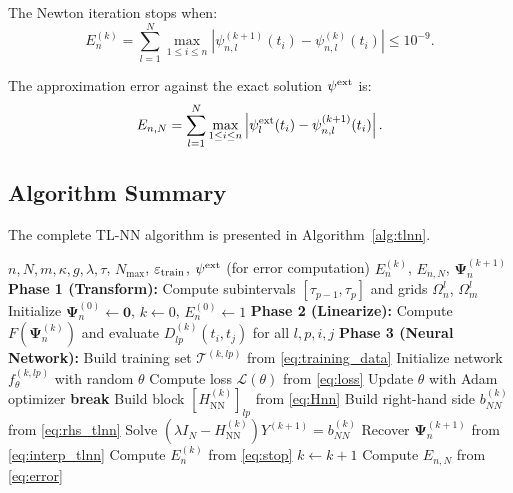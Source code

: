 \documentclass[12pt, a4paper]{article}
\newcommand{\norm}[1]{\left\| #1 \right\|}
\newcommand{\HNN}{H_{\mathrm{NN}}^{(k)}}
\newcommand{\ftheta}{f_{\theta}^{(k,lp)}}
\begin{document}
The Newton iteration stops when:
\begin{equation}
  E_n^{(k)} = \sum_{l=1}^{N} \max_{1 \leq i \leq n}
  \left|
    \psi_{n,l}^{(k+1)}(t_i) - \psi_{n,l}^{(k)}(t_i)
  \right| \leq 10^{-9}.
  \label{eq:stop}
\end{equation}

The approximation error against the exact solution
$\psi^{\rm ext}$ is:
\begin{equation}
  E_{n,N} = \sum_{l=1}^{N} \max_{1 \leq i \leq n}
  \left|
    \psi_l^{\rm ext}(t_i) - \psi_{n,l}^{(k+1)}(t_i)
  \right|.
  \label{eq:error}
\end{equation}

\subsection{Algorithm Summary}

The complete TL-NN algorithm is presented in
Algorithm~\ref{alg:tlnn}.

\begin{algorithm}[H]
\caption{TL-NN Algorithm}
\label{alg:tlnn}
\begin{algorithmic}[1]
\Require $n, N, m, \kappa, g, \lambda, \tau$,
  $N_{\max}$, $\varepsilon_{\rm train}$,
  $\psi^{\rm ext}$ (for error computation)
\Ensure $E_n^{(k)}$, $E_{n,N}$,
  $\boldsymbol{\Psi}_n^{(k+1)}$
\State \textbf{Phase 1 (Transform):}
  Compute subintervals $[\tau_{p-1}, \tau_p]$
  and grids $\Omega_n^l$, $\Omega_m^l$
\State Initialize $\boldsymbol{\Psi}_n^{(0)} \leftarrow \mathbf{0}$,
  $k \leftarrow 0$, $E_n^{(0)} \leftarrow 1$
  \State \textbf{Phase 2 (Linearize):}
    Compute $F(\boldsymbol{\Psi}_n^{(k)})$ and
    evaluate $D_{lp}^{(k)}(t_i, t_j)$ for all $l, p, i, j$
  \State \textbf{Phase 3 (Neural Network):}
    \State Build training set
      $\mathcal{T}^{(k,lp)}$ from \eqref{eq:training_data}
    \State Initialize network $\ftheta$ with random $\theta$
      \State Compute loss $\mathcal{L}(\theta)$
        from \eqref{eq:loss}
      \State Update $\theta$ with Adam optimizer
      \If{$\norm{\nabla_\theta \mathcal{L}} < \varepsilon_{\rm train}$}
        \State \textbf{break}
      \EndIf
    \EndFor
    \State Build block $[\HNN]_{lp}$
      from \eqref{eq:Hnn}
  \EndFor
  \State Build right-hand side $b_{NN}^{(k)}$
    from \eqref{eq:rhs_tlnn}
  \State Solve $(\lambda I_N - \HNN) Y^{(k+1)}
    = b_{NN}^{(k)}$
  \State Recover $\boldsymbol{\Psi}_n^{(k+1)}$
    from \eqref{eq:interp_tlnn}
  \State Compute $E_n^{(k)}$ from \eqref{eq:stop}
  \State $k \leftarrow k + 1$
\EndWhile
\State Compute $E_{n,N}$ from \eqref{eq:error}
\end{algorithmic}
\end{algorithm}
\end{document}
